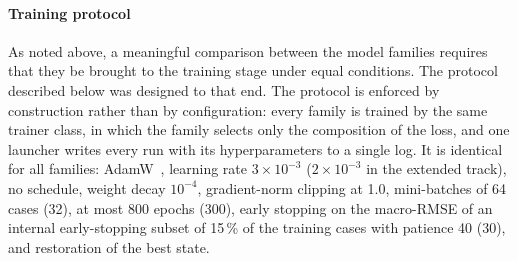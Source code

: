 \paragraph{Training protocol}
As noted above, a meaningful comparison between the model families requires
that they be brought to the training stage under equal conditions. The protocol
described below was designed to that end.
The protocol is enforced by construction rather than by configuration: every
family is trained by the same trainer class, in which the family selects only the
composition of the loss, and one launcher writes every run with its
hyperparameters to a single log.
It is identical for all families: AdamW~\citep{loshchilov2019adamw}, learning rate
$3\times10^{-3}$ ($2\times10^{-3}$ in the extended track), no schedule, weight
decay $10^{-4}$, gradient-norm clipping at 1.0, mini-batches of 64 cases (32),
at most 800 epochs (300), early stopping on the macro-RMSE of an internal
early-stopping subset of 15\,\% of the training cases with patience 40 (30), and %
restoration of the best state.
